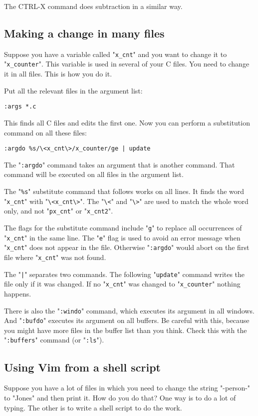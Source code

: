 The CTRL-X command does subtraction in a similar way.
\subsection{Making a change in many files}
Suppose you have a variable called "\verb!x_cnt!" and you want to change it to "\verb!x_counter!".
This variable is used in several of your C files.
You need to change it in all files.
This is how you do it.

Put all the relevant files in the argument list:

\begin{Verbatim}[samepage=true]
 :args *.c
\end{Verbatim}
 
This finds all C files and edits the first one.
Now you can perform a substitution command on all these files:

\begin{Verbatim}[samepage=true]
 :argdo %s/\<x_cnt\>/x_counter/ge | update
\end{Verbatim}

The "\verb!:argdo!" command takes an argument that is another command.
That command will be executed on all files in the argument list.

The "\verb!%s!" substitute command that follows works on all lines.
It finds the word "\verb!x_cnt!" with "\verb!\<x_cnt\>!".
The "\verb!\<!" and "\verb!\>!" are used to match the whole word only, and not "\verb!px_cnt!" or "\verb!x_cnt2!".

The flags for the substitute command include "\verb!g!" to replace all occurrences of "\verb!x_cnt!" in the same line.
The "\verb!e!" flag is used to avoid an error message when "\verb!x_cnt!" does not appear in the file.
Otherwise "\verb!:argdo!" would abort on the first file where "\verb!x_cnt!" was not found.

The "\verb!|!" separates two commands.
The following "\verb!update!" command writes the file only if it was changed.
If no "\verb!x_cnt!" was changed to "\verb!x_counter!" nothing happens.

There is also the "\verb!:windo!" command, which executes its argument in all windows.
And "\verb!:bufdo!" executes its argument on all buffers.
Be careful with this, because you might have more files in the buffer list than you think.
Check this with the "\verb!:buffers!" command (or "\verb!:ls!").
\subsection{Using Vim from a shell script}
Suppose you have a lot of files in which you need to change the string "-person-" to "Jones" and then print it.
How do you do that?  One way is to do a lot of typing.
The other is to write a shell script to do the work.


